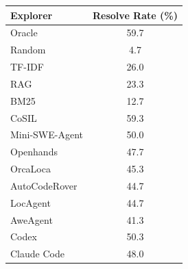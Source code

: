 \footnotesize
\renewcommand{\arraystretch}{1.15}
\begin{tabular}{@{} l c @{}}
  \toprule
  Explorer & Resolve Rate (\%) \\
  \midrule
  Oracle             & 59.7 \\
  Random             &  4.7 \\
  \midrule
  TF-IDF             & 26.0 \\
  RAG                & 23.3 \\
  BM25               & 12.7 \\
  \midrule
  CoSIL              & 59.3 \\
  Mini-SWE-Agent     & 50.0 \\
  Openhands          & 47.7 \\
  OrcaLoca           & 45.3 \\
  AutoCodeRover      & 44.7 \\
  LocAgent           & 44.7 \\
  AweAgent           & 41.3 \\
  \midrule
  Codex              & 50.3 \\
  Claude Code        & 48.0 \\
  \bottomrule
\end{tabular}
